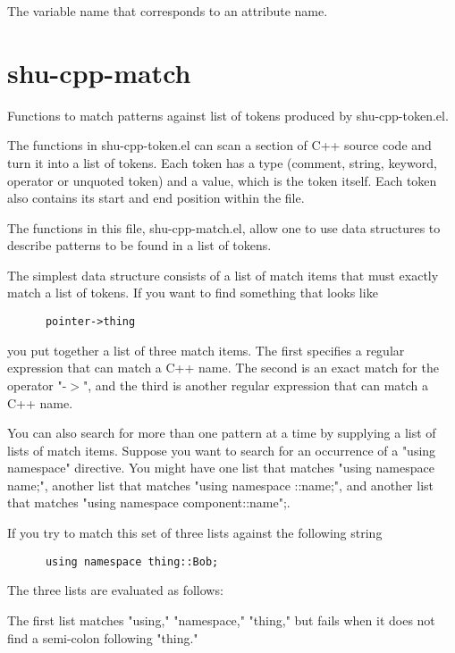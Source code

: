 \begin{doc-string}
The variable name that corresponds to an attribute name.
\end{doc-string}

\eject
\section{shu-cpp-match}


Functions to match patterns against list of tokens produced by
shu-cpp-token.el.


The functions in shu-cpp-token.el can scan a section of C++ source code and
turn it into a list of tokens.  Each token has a type (comment, string,
keyword, operator or unquoted token) and a value, which is the token itself.
Each token also contains its start and end position within the file.

The functions in this file, shu-cpp-match.el, allow one to use data
structures to describe patterns to be found in a list of tokens.

The simplest data structure consists of a list of match items that must
exactly match a list of tokens.  If you want to find something that looks
like

\small{\begin{verbatim}
      pointer->thing
\end{verbatim}}

you put together a list of three match items.  The first specifies a regular
expression that can match a C++ name.  The second is an exact match for the
operator "-$>$", and the third is another regular expression that can match a
C++ name.

You can also search for more than one pattern at a time by supplying a list
of lists of match items.  Suppose you want to search for an occurrence of a
"using namespace" directive.  You might have one list that matches "using
namespace name;", another list that matches "using namespace ::name;", and
another list that matches "using namespace component::name";.

If you try to match this set of three lists against the following string

\small{\begin{verbatim}
      using namespace thing::Bob;
\end{verbatim}}

The three lists are evaluated as follows:

The first list matches "using," "namespace," "thing," but fails when it does
not find a semi-colon following "thing."

